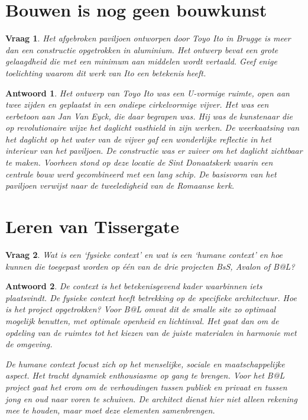 \documentclass{article}
\theoremstyle{plain}
\newtheorem{question}{Vraag}
\theoremstyle{nonumberplain}
\newtheorem{answer}{Antwoord}
\begin{document}
\section{Bouwen is nog geen bouwkunst}

\begin{question}
Het afgebroken paviljoen ontworpen door Toyo Ito in Brugge is meer dan een
constructie opgetrokken in aluminium. Het ontwerp bevat een grote gelaagdheid
die met een minimum aan middelen wordt vertaald. Geef enige toelichting waarom
dit werk van Ito een betekenis heeft.
\end{question}

\begin{answer}

Het ontwerp van Toyo Ito was een U-vormige ruimte, open aan twee zijden en
geplaatst in een ondiepe cirkelvormige vijver. Het was een eerbetoon aan Jan Van
Eyck, die daar begrapen was. Hij was de kunstenaar die op revolutionaire wijze
het daglicht vasthield in zijn werken. De weerkaatsing van het daglicht op het
water van de vijver gaf een wonderlijke reflectie in het interieur van het
paviljoen. De constructie was er zuiver om het daglicht zichtbaar te maken.
Voorheen stond op deze locatie de Sint Donaatskerk waarin een centrale bouw werd
gecombineerd met een lang schip. De basisvorm van het paviljoen verwijst naar de
tweeledigheid van de Romaanse kerk.

\end{answer}

\section{Leren van Tissergate}

\begin{question}
Wat is een `fysieke context' en wat is een `humane context' en hoe kunnen
die toegepast worden op één van de drie projecten BsS, Avalon of B@L?
\end{question}

\begin{answer}

De \emph{context} is het betekenisgevend kader waarbinnen iets plaatsvindt. De
\emph{fysieke context} heeft betrekking op de specifieke architectuur. Hoe is
het project opgetrokken? Voor B@L omvat dit de smalle site zo optimaal mogelijk
benutten, met optimale openheid en lichtinval. Het gaat dan om de opdeling van
de ruimtes tot het kiezen van de juiste materialen in harmonie met de omgeving.

De \emph{humane context} focust zich op het menselijke, sociale en
maatschappelijke aspect. Het tracht dynamiek enthousiasme op gang te brengen.
Voor het B@L project gaat het erom om de verhoudingen tussen publiek en privaat
en tussen jong en oud naar voren te schuiven. De architect dienst hier niet
alleen rekening mee te houden, maar moet deze elementen samenbrengen.

\end{answer}
\end{document}
